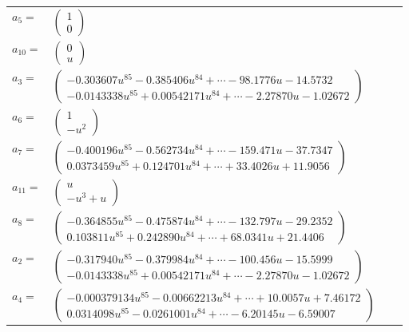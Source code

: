 \documentclass[1p]{elsarticle_modified}
\theoremstyle{definition}
\begin{document}
\begin{tabular}{m{7pt} m{180pt} m{7pt} m{180pt} }
\flushright $a_{5}=$&$\begin{pmatrix}1\\0\end{pmatrix}$ \\
\flushright $a_{10}=$&$\begin{pmatrix}0\\u\end{pmatrix}$ \\
\flushright $a_{3}=$&$\begin{pmatrix}-0.303607 u^{85}-0.385406 u^{84}+\cdots-98.1776 u-14.5732\\-0.0143338 u^{85}+0.00542171 u^{84}+\cdots-2.27870 u-1.02672\end{pmatrix}$ \\
\flushright $a_{6}=$&$\begin{pmatrix}1\\- u^2\end{pmatrix}$ \\
\flushright $a_{7}=$&$\begin{pmatrix}-0.400196 u^{85}-0.562734 u^{84}+\cdots-159.471 u-37.7347\\0.0373459 u^{85}+0.124701 u^{84}+\cdots+33.4026 u+11.9056\end{pmatrix}$ \\
\flushright $a_{11}=$&$\begin{pmatrix}u\\- u^3+u\end{pmatrix}$ \\
\flushright $a_{8}=$&$\begin{pmatrix}-0.364855 u^{85}-0.475874 u^{84}+\cdots-132.797 u-29.2352\\0.103811 u^{85}+0.242890 u^{84}+\cdots+68.0341 u+21.4406\end{pmatrix}$ \\
\flushright $a_{2}=$&$\begin{pmatrix}-0.317940 u^{85}-0.379984 u^{84}+\cdots-100.456 u-15.5999\\-0.0143338 u^{85}+0.00542171 u^{84}+\cdots-2.27870 u-1.02672\end{pmatrix}$ \\
\flushright $a_{4}=$&$\begin{pmatrix}-0.000379134 u^{85}-0.00662213 u^{84}+\cdots+10.0057 u+7.46172\\0.0314098 u^{85}-0.0261001 u^{84}+\cdots-6.20145 u-6.59007\end{pmatrix}$ \\

\end{tabular}
\end{document}
